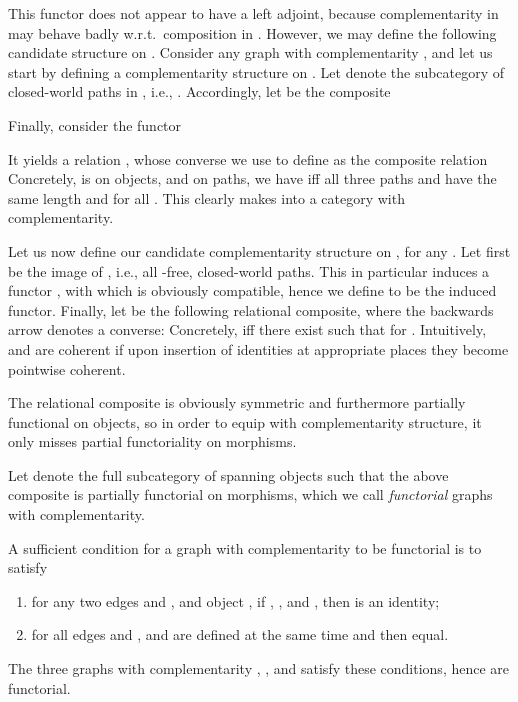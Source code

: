 \documentclass{LMCS}
\theoremstyle{plain}\newtheorem{satz}[thm]{Satz}
\begin{document}
This functor does not appear to have a left adjoint, because
complementarity in  may behave badly w.r.t.\ composition in
. However, we may define the following candidate structure on .
Consider any graph with complementarity , and
  let us start by defining a complementarity structure on .
  Let  denote the subcategory of closed-world paths in , 
  i.e., .
  Accordingly, let  be the composite
  
  Finally, consider the functor
  
  It yields a relation , whose
  converse we use to define  as the composite relation
   Concretely,  is  on objects, 
  and on paths, we have  iff all three
  paths  and  have the same length  and
   for all .  This clearly makes
   into a category with complementarity.
  
  Let us now define our candidate complementarity structure on ,
  for any .  Let first  be the image of
  , i.e., all
  -free, closed-world paths.  This in particular induces a
  functor , with which
   is obviously compatible, hence we define
   to be the induced functor.  Finally, let
   be the following relational composite, where the backwards
  arrow denotes a converse:
   Concretely, 
  iff there exist  such that  for .  Intuitively,  and  are
  coherent if upon insertion of identities at appropriate places they
  become pointwise coherent.  

  The relational composite  is obviously symmetric and furthermore partially functional
  on objects, so in order to equip  with complementarity
  structure, it only misses partial functoriality on morphisms.

  \begin{defi}
    Let  denote the full subcategory of  spanning
    objects  such that the above composite is partially functorial
    on morphisms, which we call \emph{functorial} graphs with
    complementarity.
  \end{defi}

  \begin{exa}
    A sufficient condition for a graph with complementarity  to be
    functorial is to satisfy
     \begin{enumerate}[label=(\roman*)]
     \item for any two edges  and , and object , if , , and , then  is an identity;
     \item for all edges  and ,  and 
       are defined at the same time and then equal.
     \end{enumerate}    
     The three graphs with complementarity , , and
      satisfy these conditions, hence are functorial.
  \end{exa}
\end{document}
